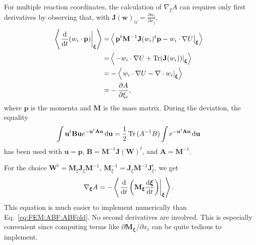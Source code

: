 For multiple reaction coordinates, the calculation of $\nabla_\xi A$ can requires only first derivatives by observing that, with $\mathbf{J}(\mathbf{w})_{ij}=\frac{\partial w_i}{\partial x_j}$,
\begin{align}
    \left<\left.\frac{\mathop{}\!\mathrm{d} }{\mathop{}\!\mathrm{d} t}(w_i\cdot \mathbf{p})\right|_{\boldsymbol{\xi}}\right>=&\left<\left.\mathbf{p}^t\mathbf{M}^{-1}\mathbf{J}(w_i)^t\mathbf{p}-w_i\cdot \nabla U\right|_{\boldsymbol{\xi}}\right>\notag\\
    =&\left<\left.-w_i\cdot \nabla U+\operatorname{Tr}(\mathbf{J}(w_i))\right|_{\boldsymbol{\xi}}\right>\notag\\
    =&-\left<\left.w_i\cdot\nabla U-\nabla\cdot w_i\right|_{\boldsymbol{\xi}}\right>\notag\\
    =&-\frac{\partial A}{\partial \xi_i},
\end{align}
where $\mathbf{p}$ is the momenta and $\mathbf{M}$ is the mass matrix. During the deviation, the equality
\begin{equation}
    \int \mathbf{u}^t\mathbf{B}\mathbf{u}e^{-\mathbf{u}^t\mathbf{A}\mathbf{u}}\mathop{}\!\mathrm{d} \mathbf{u}=\frac{1}{2}\operatorname{Tr}{(A^{-1}B)}\int e^{-\mathbf{u}^{t}\mathbf{A}\mathbf{u}}\mathop{}\!\mathrm{d} \mathbf{u}
\end{equation}
has been used with $\mathbf{u}=\mathbf{p}$, $\mathbf{B}=\mathbf{M}^{-1}\mathbf{J}(\mathbf{W})^t$, and $\mathbf{A}=\mathbf{M}^{-1}$.

For the choice $\mathbf{W}^t=\mathbf{M}_{\xi}\mathbf{J}_{\xi}\mathbf{M}^{-1}$, $\mathbf{M}_{\xi}^{-1}=\mathbf{J}_{\xi}\mathbf{M}^{-1}\mathbf{J}_{\xi}^t$, we get
\begin{equation}
    \nabla_{\boldsymbol{\xi}}A=-\left<\left.\frac{\mathop{}\!\mathrm{d}}{\mathop{}\!\mathrm{d} t}\left(\mathbf{M}_{\boldsymbol{\xi}}\frac{\mathop{}\!\mathrm{d} \boldsymbol{\xi}}{\mathop{}\!\mathrm{d} t}\right)\right|_{\boldsymbol{\xi}}\right>.
    \label{eq:FEM:ABF:ABFnew}
\end{equation}
This equation is much easier to implement numerically than Eq.~\ref{eq:FEM:ABF:ABFold}. No second derivatives are involved. This is especially convenient since computing terms like $\partial \mathbf{M}_{\boldsymbol{\xi}}/\partial x_t$ can be quite tedious to implement.
